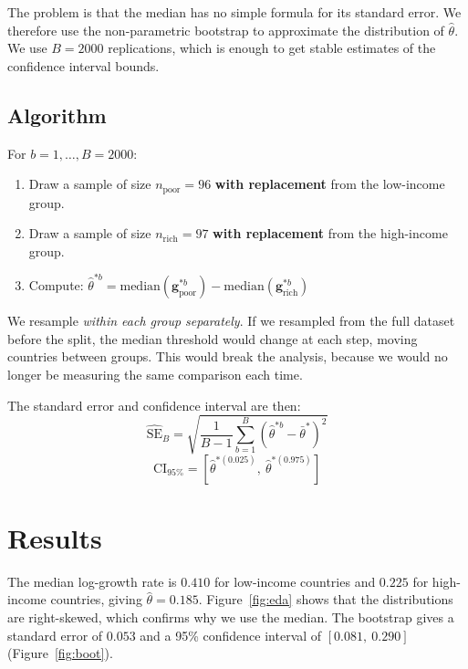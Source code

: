 \documentclass[10pt, twocolumn, a4paper]{article}
\begin{document}
The problem is that the median has no simple formula for its standard error. We therefore use
the non-parametric bootstrap to approximate the distribution of $\hat{\theta}$. We use
$B = 2000$ replications, which is enough to get stable estimates of the confidence interval bounds.

\subsection*{Algorithm}
For $b = 1, \ldots, B = 2000$:
\begin{enumerate}
    \item Draw a sample of size $n_{\text{poor}} = 96$ \textbf{with replacement} from the
          low-income group.
    \item Draw a sample of size $n_{\text{rich}} = 97$ \textbf{with replacement} from the
          high-income group.
    \item Compute: $\hat{\theta}^{*b} = \text{median}(\mathbf{g}^{*b}_{\text{poor}}) -
          \text{median}(\mathbf{g}^{*b}_{\text{rich}})$
\end{enumerate}

We resample \textit{within each group separately}. If we resampled from the full dataset
before the split, the median threshold would change at each step, moving countries between
groups. This would break the analysis, because we would no longer be measuring the same
comparison each time.

The standard error and confidence interval are then:
\begin{equation}
    \widehat{\text{SE}}_B = \sqrt{\frac{1}{B-1}\sum_{b=1}^{B}\!\left(\hat{\theta}^{*b} - \bar{\theta}^*\right)^2}
\end{equation}
\begin{equation}
    \text{CI}_{95\%} = \left[\hat{\theta}^{*(0.025)},\ \hat{\theta}^{*(0.975)}\right]
\end{equation}

\section{Results}

The median log-growth rate is $0.410$ for low-income countries and $0.225$ for high-income
countries, giving $\hat{\theta} = 0.185$. Figure~\ref{fig:eda} shows that the distributions
are right-skewed, which confirms why we use the median. The bootstrap gives a standard error
of $0.053$ and a 95\% confidence interval of $[0.081,\ 0.290]$ (Figure~\ref{fig:boot}).
\end{document}
